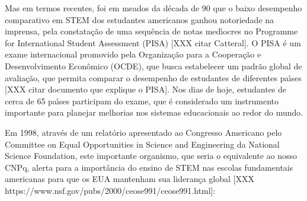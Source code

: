 \documentclass[
12pt,		%
openright,	%
twoside,  %
a4paper,			%
chapter=TITLE,		%
english,			%
french,				%
spanish,			%
brazil				%
]{USPSC-classe/USPSC_RedarTex}
\begin{document}
\noindent\begin{center}\mbox{\centering{}}\end{center}


Mas em termos recentes, foi em meados da d\'ecada de 90 que o baixo desempenho comparativo em STEM dos estudantes americanos ganhou notoriedade na imprensa, pela constata\c{c}\~ao de uma sequ\^encia de notas med\'{\i}ocres no Programme for International Student Assessment (PISA) [XXX citar Catteral]. O PISA \'e um exame internacional promovido pela Organiza\c{c}\~ao para a Coopera\c{c}\~ao e Desenvolvimento Econ\^omico (OCDE), que busca estabelecer um padr\~ao global de avalia\c{c}\~ao, que permita comparar o desempenho de estudantes de diferentes pa\'{\i}ses [XXX citar documento que explique o PISA]. Nos dias de hoje, estudantes de cerca de 65 pa\'{\i}ses participam do exame, que \'e considerado um instrumento importante para planejar melhorias nos sistemas educacionais ao redor do mundo.










Em 1998, atrav\'es de um relat\'orio apresentado ao Congresso Americano pelo Committee on Equal Opportunities in Science and Engineering da National Science Foundation, este importante organismo, que seria o equivalente ao nosso CNPq, alerta para a import\^ancia do ensino de STEM nas escolas fundamentais americanas para que os EUA mantenham sua lideran\c{c}a global [XXX https://www.nsf.gov/pubs/2000/ceose991/ceose991.html]:











\noindent\begin{center}\mbox{\centering{}}\end{center}
\end{document}
